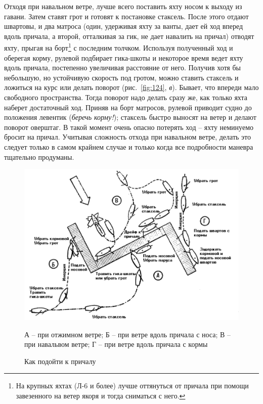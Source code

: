 \documentclass[a4paper, 12pt, twoside, final]{scrbook}
\begin{document}
Отходя при навальном ветре, лучше всего поставить яхту носом к выходу из гавани. Затем ставят грот и готовят к постановке стаксель. После этого отдают швартовы, и два матроса (один, удерживая яхту за ванты, дает ей ход вперед вдоль причала, а второй, отталкивая за гик, не дает навалить на причал) отводят яхту, прыгая на борт\footnote{На крупных яхтах (Л-6 и более) лучше оттянуться от причала при помощи завезенного на ветер якоря и тогда сниматься с него.} с последним толчком. Используя полученный ход и оберегая корму, рулевой подбирает гика-шкоты и некоторое время ведет яхту вдоль причала, постепенно увеличивая расстояние от него. Получив хотя бы небольшую, но устойчивую скорость под гротом, можно ставить стаксель и ложиться на курс или делать поворот (рис.~\ref{fig:124}, \textit{в}). Бывает, что впереди мало свободного пространства. Тогда поворот надо делать сразу же, как только яхта наберет достаточный ход. Приняв на борт матросов, рулевой приводит судно до положения левентик (\textit{беречь корму!}); стаксель быстро выносят на ветер и делают поворот оверштаг. В такой момент очень опасно потерять ход \--- яхту неминуемо бросит на причал. Учитывая сложность отхода при навальном ветре, делать это следует только в самом крайнем случае и только когда все подробности маневра тщательно продуманы.


\begin{figure}[htbp]
   \centering
   \includegraphics{125_Kak_podojti} %
   \caption{Как подойти к причалу}
   \label{fig:125}
   \centering\small
   А \--- при отжимном ветре; Б \--- при ветре вдоль причала с носа; В \--- при навальвом ветре; Г \--- при ветре  вдоль причала с кормы
\end{figure}
\end{document}
